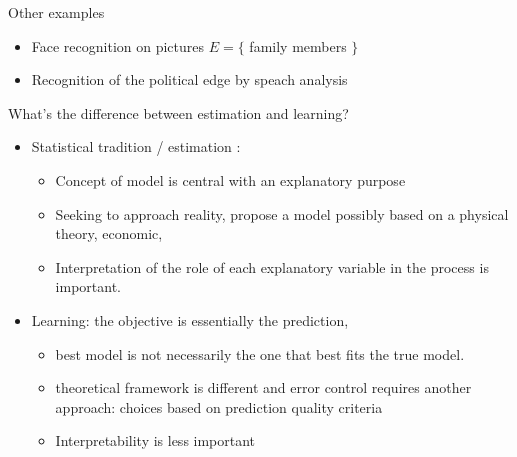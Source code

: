 \documentclass[ignorenonframetext,]{beamer}
\providecommand{\tightlist}{%
  \setlength{\itemsep}{0pt}\setlength{\parskip}{0pt}}
\begin{document}
\begin{frame}{Other examples}
\protect\hypertarget{other-examples}{}

\begin{itemize}
\tightlist
\item
  Face recognition on pictures \(E = \{\) family members \(\}\)
\item
  Recognition of the political edge by speach analysis
\end{itemize}

\end{frame}

\begin{frame}{What's the difference between estimation and learning?}
\protect\hypertarget{whats-the-difference-between-estimation-and-learning}{}

\begin{itemize}
\item
  Statistical tradition / estimation :

  \begin{itemize}
  \tightlist
  \item
    Concept of model is central with an explanatory purpose
  \item
    Seeking to approach reality, propose a model possibly based on a
    physical theory, economic,
  \item
    Interpretation of the role of each explanatory variable in the
    process is important.
  \end{itemize}
\item
  Learning: the objective is essentially the prediction,

  \begin{itemize}
  \tightlist
  \item
    best model is not necessarily the one that best fits the true model.
  \item
    theoretical framework is different and error control requires
    another approach: choices based on prediction quality criteria
  \item
    Interpretability is less important
  \end{itemize}
\end{itemize}

\end{frame}
\end{document}
